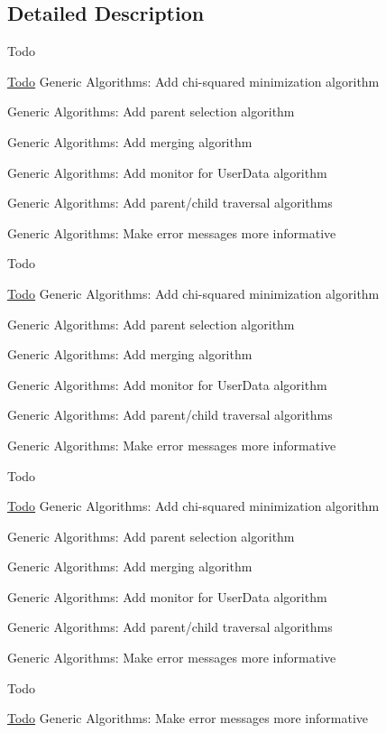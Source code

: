\subsection{Detailed Description}
\begin{DoxyRefDesc}{Todo}
\item[\hyperlink{todo__todo000001}{Todo}]Generic Algorithms\+: Add chi-\/squared minimization algorithm 

Generic Algorithms\+: Add parent selection algorithm 

Generic Algorithms\+: Add merging algorithm 

Generic Algorithms\+: Add monitor for User\+Data algorithm 

Generic Algorithms\+: Add parent/child traversal algorithms 

Generic Algorithms\+: Make error messages more informative \end{DoxyRefDesc}


\begin{DoxyRefDesc}{Todo}
\item[\hyperlink{todo__todo000002}{Todo}]Generic Algorithms\+: Add chi-\/squared minimization algorithm 

Generic Algorithms\+: Add parent selection algorithm 

Generic Algorithms\+: Add merging algorithm 

Generic Algorithms\+: Add monitor for User\+Data algorithm 

Generic Algorithms\+: Add parent/child traversal algorithms 

Generic Algorithms\+: Make error messages more informative \end{DoxyRefDesc}


\begin{DoxyRefDesc}{Todo}
\item[\hyperlink{todo__todo000003}{Todo}]Generic Algorithms\+: Add chi-\/squared minimization algorithm 

Generic Algorithms\+: Add parent selection algorithm 

Generic Algorithms\+: Add merging algorithm 

Generic Algorithms\+: Add monitor for User\+Data algorithm 

Generic Algorithms\+: Add parent/child traversal algorithms 

Generic Algorithms\+: Make error messages more informative \end{DoxyRefDesc}


\begin{DoxyRefDesc}{Todo}
\item[\hyperlink{todo__todo000004}{Todo}]Generic Algorithms\+: Make error messages more informative \end{DoxyRefDesc}


